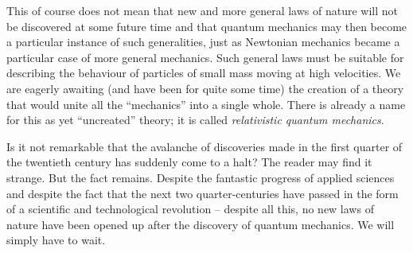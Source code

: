 This of course does not mean that new and more general laws of nature will not be discovered at some future time and that quantum mechanics may then become a particular instance of such generalities, just as Newtonian mechanics became a particular case of more general me­chanics. Such general laws must be suitable for describing the behaviour of particles of small mass moving at high velocities. We are eagerly awaiting (and have been for quite some time) the creation of a theory that would unite all the ``mechanics'' into a single whole. There is already a name for this as yet ``uncreated'' theory; it is called \emph{relativistic quantum mechanics}.

Is it not remarkable that the avalanche of discoveries made in the first quarter of the twentieth century has suddenly come to a halt? The reader may find it strange. But the fact remains. Despite the fantastic progress of applied sciences and despite the fact that the next two quarter-centuries have passed in the form of a scientific and technological revolution -- despite all this, no new laws of nature have been opened up after the discovery of quantum mechanics. We will simply have to wait.


%




